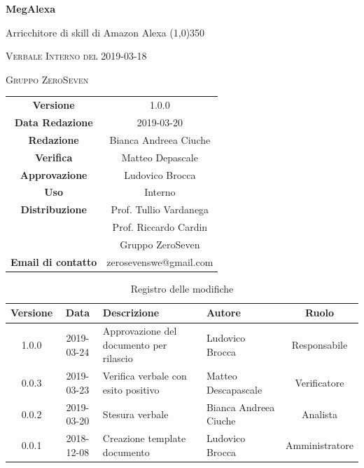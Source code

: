 \documentclass[a4paper,12pt]{article}
\author{Bianca Andreea Ciuche}
\date{2019-03-20}
\begin{document}
	\begin{titlepage}
		\centering
		{\huge\bfseries MegAlexa\par}
		Arricchitore di skill di Amazon Alexa
		\line(1,0){350} \\
		{\scshape\LARGE Verbale Interno del 2019-03-18 \par}
		\vspace{1cm}
		{\scshape Gruppo ZeroSeven \par}
		\logo
		\begin{tabular}{c|c}
			{\hfill \textbf{Versione}} 			& 1.0.0				\\
			{\hfill\textbf{Data Redazione}} 	& 2019-03-20		\\ 
			{\hfill\textbf{Redazione}} 			&  		Bianca Andreea Ciuche		\\ 
			{\hfill\textbf{Verifica}} 				&  	 Matteo Depascale \\ 
			{\hfill\textbf{Approvazione}} 		&  Ludovico Brocca\\ 
			{\hfill\textbf{Uso}} 					& 	Interno	\\ 
			{\hfill\textbf{Distribuzione}} 			& 			Prof. Tullio Vardanega \\ & Prof. Riccardo Cardin \\ & Gruppo ZeroSeven 	\\ 
			{\hfill\textbf{Email di contatto}} & zerosevenswe@gmail.com \\
		\end{tabular}
	\end{titlepage}
	
	
	
	\label{LastFrontPage}
	
	
	\newpage
	\cleardoublepage
	\begin{table}[tbph]
		\centering
		\begin{tabularx}{\textwidth}{|c|c|X|X|c|}
			\hline
			\textbf{Versione} & \textbf{Data} & \textbf{Descrizione} & \textbf{Autore} & \textbf{Ruolo} \\
			\hline
			1.0.0 & 2019-03-24 & Approvazione del documento per rilascio& Ludovico Brocca &  Responsabile \\
			\hline
			0.0.3 & 2019-03-23 & Verifica verbale con esito positivo & Matteo Descapascale  & Verificatore \\
			\hline
			0.0.2 & 2019-03-20 & Stesura verbale &Bianca Andreea Ciuche  & Analista \\
			\hline
			0.0.1 & 2018-12-08 & Creazione template documento & Ludovico Brocca & Amministratore\\
			\hline
		\end{tabularx}
		\caption{Registro delle modifiche}
	\end{table}
	\cleardoublepage
	\pagestyle{mymain}
	
\end{document}
